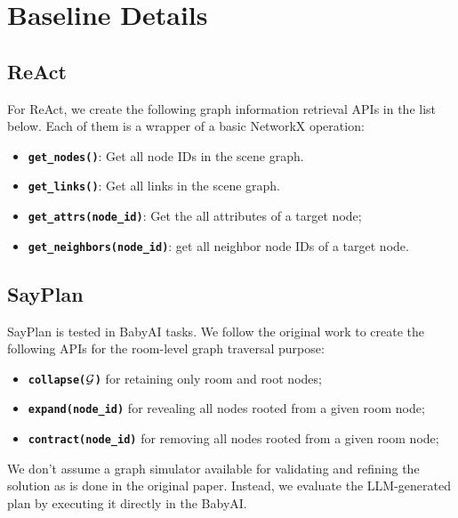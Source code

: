 


\section{Baseline Details}
\label{app:BaseDetail}
\subsection{ReAct}
For ReAct, we create the following graph information retrieval APIs in the list below. Each of them is a wrapper of a basic NetworkX \citep{networkx} operation:
\begin{itemize}
    \item \textbf{\texttt{get\_nodes()}}: Get all node IDs in the scene graph.
    \item \textbf{\texttt{get\_links()}}: Get all links in the scene graph.
    \item \textbf{\texttt{get\_attrs(node\_id)}}: Get the all attributes of a target node;
    \item \textbf{\texttt{get\_neighbors(node\_id)}}: get all neighbor node IDs of a target node.
\end{itemize}

\subsection{SayPlan}
SayPlan \citep{sayplan} is tested in BabyAI tasks. We follow the original work to create the following APIs for the room-level graph traversal purpose: 
\begin{itemize}
  \item \textbf{\texttt{collapse(${\mathcal{G}}$)}} for retaining only room and root nodes;
  \item \textbf{\texttt{expand(node\_id)}} for revealing all nodes rooted from a given room node;
  \item \textbf{\texttt{contract(node\_id)}} for removing all nodes rooted from a given room node;
\end{itemize}
We don't assume a graph simulator available for validating and refining the solution as is done in the original paper. Instead, we evaluate the LLM-generated plan by executing it directly in the BabyAI.





